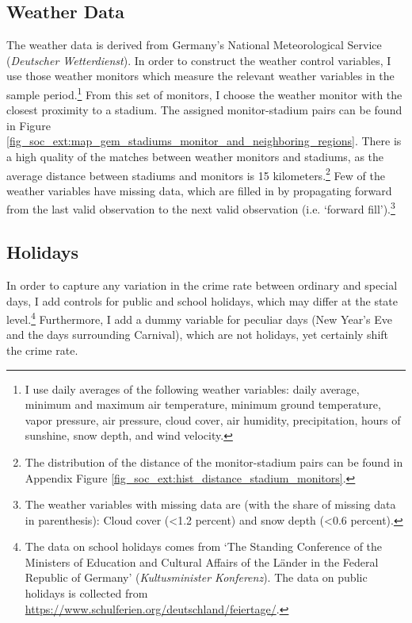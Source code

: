 \subsection{Weather Data}
The weather data is derived from Germany's National Meteorological Service (\textit{Deutscher Wetterdienst}). In order to construct the weather control variables, I use those weather monitors which measure the relevant weather variables in the sample period.\footnote{I use daily averages of the following weather variables: daily average, minimum and maximum air temperature, minimum ground temperature, vapor pressure, air pressure, cloud cover, air humidity, precipitation, hours of sunshine, snow depth, and wind velocity.} From this set of monitors, I choose the weather monitor with the closest proximity to a stadium. The assigned monitor-stadium pairs can be found in Figure \ref{fig_soc_ext:map_gem_stadiums_monitor_and_neighboring_regions}. There is a high quality of the matches between weather monitors and stadiums, as the average distance between stadiums and monitors is 15 kilometers.\footnote{The distribution of the distance of the monitor-stadium pairs can be found in Appendix Figure \ref{fig_soc_ext:hist_distance_stadium_monitors}.} Few of the weather variables have missing data, which are filled in by propagating forward from the last valid observation to the next valid observation (i.e. `forward fill').\footnote{The weather variables with missing data are (with the share of missing data in parenthesis): Cloud cover (<1.2 percent) and snow depth (<0.6 percent).}



\subsection{Holidays}
In order to capture any variation in the crime rate between ordinary and special days, I add controls for public and school holidays, which may differ at the state level.\footnote{The data on school holidays comes from `The Standing Conference of the Ministers of Education and Cultural Affairs of the Länder in the Federal Republic of Germany' (\textit{Kultusminister Konferenz}). The data on public holidays is collected from \href{https://www.schulferien.org/deutschland/feiertage/}{https://www.schulferien.org/deutschland/feiertage/}.} Furthermore, I add a dummy variable for peculiar days (New Year's Eve and the days surrounding Carnival), which are not holidays, yet certainly shift the crime rate.



